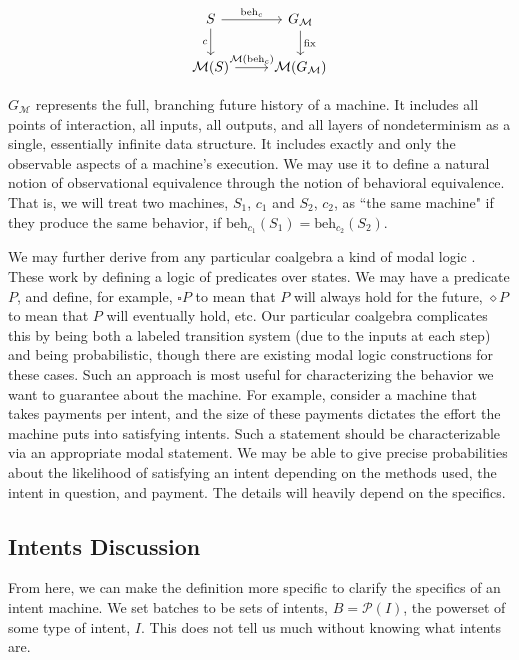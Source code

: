 \begin{equation}
\begin{tikzcd}
S \arrow{r}{\text{beh}_c} \arrow[swap]{d}{c} & G_\mathcal{M} \arrow{d}{\text{fix}} \\
\mathcal{M}(S) \arrow{r}{\mathcal{M}(\text{beh}_c)} & \mathcal{M}(G_\mathcal{M})
\end{tikzcd}
\end{equation}

$G_\mathcal{M}$ represents the full, branching future history of a machine. It includes all points of interaction, all inputs, all outputs, and all layers of nondeterminism as a single, essentially infinite data structure. It includes exactly and only the observable aspects of a machine's execution. We may use it to define a natural notion of observational equivalence through the notion of behavioral equivalence. That is, we will treat two machines, $S_1$, $c_1$ and $S_2$, $c_2$, as ``the same machine" if they produce the same behavior, if $\text{beh}_{c_1}(S_1) = \text{beh}_{c_2}(S_2)$.

We may further derive from any particular coalgebra a kind of modal logic \citep{kupke2011coalgebraic}. These work by defining a logic of predicates over states. We may have a predicate $P$, and define, for example, $\square P$ to mean that $P$ will always hold for the future, $\diamond P$ to mean that $P$ will eventually hold, etc. Our particular coalgebra complicates this by being both a labeled transition system (due to the inputs at each step) and being probabilistic, though there are existing modal logic constructions for these cases. Such an approach is most useful for characterizing the behavior we want to guarantee about the machine. For example, consider a machine that takes payments per intent, and the size of these payments dictates the effort the machine puts into satisfying intents. Such a statement should be characterizable via an appropriate modal statement. We may be able to give precise probabilities about the likelihood of satisfying an intent depending on the methods used, the intent in question, and payment. The details will heavily depend on the specifics.

\subsection{Intents Discussion}

From here, we can make the definition more specific to clarify the specifics of an intent machine. We set batches to be sets of intents, $B = \mathcal{P}(I)$, the powerset of some type of intent, $I$. This does not tell us much without knowing what intents are.

